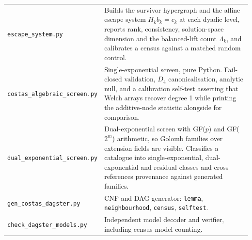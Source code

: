 \documentclass[11pt,a4paper]{article}
\theoremstyle{definition}
\begin{document}
\begin{longtable}{@{}l p{}@{}}
\texttt{escape\_system.py} & Builds the survivor hypergraph and the affine
  escape system $H_kb_k=c_k$ at each dyadic level, reports rank, consistency,
  solution-space dimension and the balanced-lift count $\Lambda_k$, and
  calibrates a census against a matched random control. \\
\texttt{costas\_algebraic\_screen.py} & Single-exponential screen, pure Python.
  Fail-closed validation, $D_4$ canonicalisation, analytic null, and a
  calibration self-test asserting that Welch arrays recover degree 1 while
  printing the additive-node statistic alongside for comparison. \\
\texttt{dual\_exponential\_screen.py} & Dual-exponential screen with GF($p$) and
  GF($2^m$) arithmetic, so Golomb families over extension fields are visible.
  Classifies a catalogue into single-exponential, dual-exponential and residual
  classes and cross-references provenance against generated families. \\
\texttt{gen\_costas\_dagster.py} & CNF and DAG generator: \texttt{lemma},
  \texttt{neighbourhood}, \texttt{census}, \texttt{selftest}. \\
\texttt{check\_dagster\_models.py} & Independent model decoder and verifier,
  including census model counting. \\
\bottomrule
\end{longtable}
\end{document}
